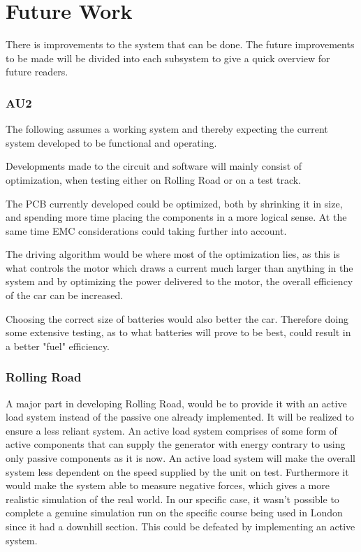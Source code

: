\chapter {Future Work}
There is improvements to the system that can be done. The future improvements to be made will be divided into each subsystem to give a quick overview for future readers. 

\subsection*{AU2}
The following assumes a working system and thereby expecting the current system developed to be functional and operating.

Developments made to the circuit and software will mainly consist of optimization, when testing either on Rolling Road or on a test track. 

The PCB currently developed could be optimized, both by shrinking it in size, and spending more time placing the components in a more logical sense. At the same time EMC considerations could taking further into account. 

The driving algorithm would be where most of the optimization lies, as this is what controls the motor which draws a current much larger than anything in the system and by optimizing the power delivered to the motor, the overall efficiency of the car can be increased. 

Choosing the correct size of batteries would also better the car. Therefore doing some extensive testing, as to what batteries will prove to be best, could result in a better "fuel" efficiency. 

\subsection*{Rolling Road}
A major part in developing Rolling Road, would be to provide it with an active load system instead of the passive one already implemented. It will be realized to ensure a less reliant system. An active load system comprises of some form of active components that can supply the generator with energy contrary to using only passive components as it is now. An active load system will make the overall system less dependent on the speed supplied by the unit on test. Furthermore it would make the system able to measure negative forces, which gives a more realistic simulation of the real world. In our specific case, it wasn't possible to complete a  genuine simulation run on the specific course being used in London since it had a downhill section. This could be defeated by implementing an active system. 

